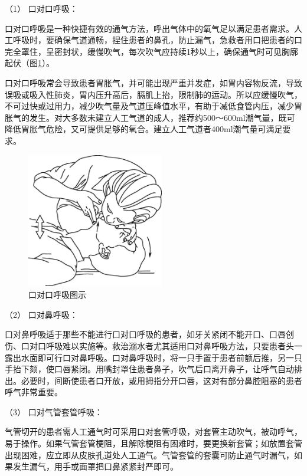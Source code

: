 \hypertarget{text00283.htmlux5cux23CHP10-1-4-3-2-1}{}
（1） 口对口呼吸：

口对口呼吸是一种快捷有效的通气方法，呼出气体中的氧气足以满足患者需求。人工呼吸时，要确保气道通畅，捏住患者的鼻孔，防止漏气，急救者用口把患者的口完全罩住，呈密封状，缓慢吹气，每次吹气应持续1秒以上，确保通气时可见胸廓起伏（图\ref{fig101-4}）。

口对口呼吸常会导致患者胃胀气，并可能出现严重并发症，如胃内容物反流，导致误吸或吸入性肺炎，胃内压升高后，膈肌上抬，限制肺的运动。所以应缓慢吹气，不可过快或过用力，减少吹气量及气道压峰值水平，有助于减低食管内压，减少胃胀气的发生。对大多数未建立人工气道的成人，推荐约500～600ml潮气量，既可降低胃胀气危险，又可提供足够的氧合。建立人工气道者400ml潮气量可满足要求。

\begin{figure}[!htbp]
 \centering
 \includegraphics[width=2.35417in,height=2.32292in]{./images/Image00407.jpg}
 \captionsetup{justification=centering}
 \caption{口对口呼吸图示}
 \label{fig101-4}
  \end{figure} 

\hypertarget{text00283.htmlux5cux23CHP10-1-4-3-2-2}{}
（2） 口对鼻呼吸：

口对鼻呼吸适于那些不能进行口对口呼吸的患者，如牙关紧闭不能开口、口唇创伤、口对口呼吸难以实施等。救治溺水者尤其适用口对鼻呼吸方法，只要患者头一露出水面即可行口对鼻呼吸。口对鼻呼吸时，将一只手置于患者前额后推，另一只手抬下颏，使口唇紧闭。用嘴封罩住患者鼻子，吹气后口离开鼻子，让呼气自动排出。必要时，间断使患者口开放，或用拇指分开口唇，这对有部分鼻腔阻塞的患者呼气非常重要。

\hypertarget{text00283.htmlux5cux23CHP10-1-4-3-2-3}{}
（3） 口对气管套管呼吸：

气管切开的患者需人工通气时可采用口对套管呼吸，对套管主动吹气，被动呼气，易于操作。如果气管套管梗阻，且解除梗阻有困难时，要更换新套管；如放置套管出现困难，应立即从皮肤孔道处人工通气。气管套管的套囊可防止通气时漏气，如果发生漏气，用手或面罩把口鼻紧紧封严即可。

